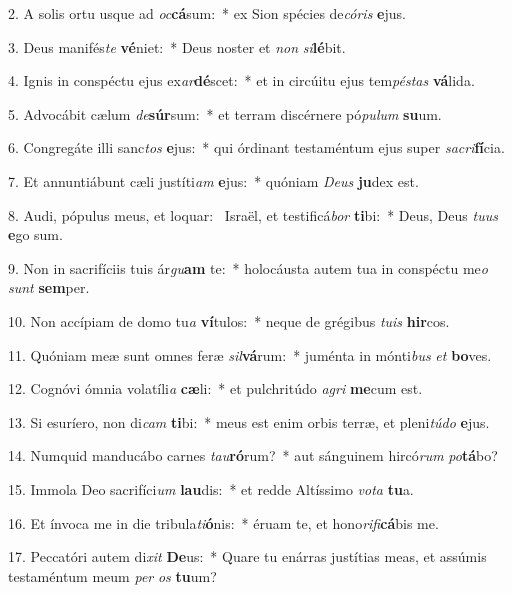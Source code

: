 2. A solis ortu usque ad \textit{oc}\textbf{cá}sum:~*  ex Sion spécies de\textit{có}\textit{ris} \textbf{e}jus.\

3. Deus manifés\textit{te} \textbf{vé}niet:~*  Deus noster et \textit{non} \textit{si}\textbf{lé}bit.\

4. Ignis in conspéctu ejus ex\textit{ar}\textbf{dé}scet:~*  et in circúitu ejus tem\textit{pés}\textit{tas} \textbf{vá}lida.\

5. Advocábit cælum \textit{de}\textbf{súr}sum:~*  et terram discérnere pó\textit{pu}\textit{lum} \textbf{su}um.\

6. Congregáte illi sanc\textit{tos} \textbf{e}jus:~*  qui órdinant testaméntum ejus super \textit{sa}\textit{cri}\textbf{fí}cia.\

7. Et annuntiábunt cæli justíti\textit{am} \textbf{e}jus:~*  quóniam \textit{De}\textit{us} \textbf{ju}dex est.\

8. Audi, pópulus meus, et loquar: \dag\  Israël, et testificá\textit{bor} \textbf{ti}bi:~*  Deus, Deus \textit{tu}\textit{us} \textbf{e}go sum.\

9. Non in sacrifíciis tuis ár\textit{gu}\textbf{am} te:~*  holocáusta autem tua in conspéctu me\textit{o} \textit{sunt} \textbf{sem}per.\

10. Non accípiam de domo tu\textit{a} \textbf{ví}tulos:~*  neque de grégibus \textit{tu}\textit{is} \textbf{hir}cos.\

11. Quóniam meæ sunt omnes feræ \textit{sil}\textbf{vá}rum:~*  juménta in mónti\textit{bus} \textit{et} \textbf{bo}ves.\

12. Cognóvi ómnia volatíli\textit{a} \textbf{cæ}li:~*  et pulchritúdo \textit{a}\textit{gri} \textbf{me}cum est.\

13. Si esuríero, non di\textit{cam} \textbf{ti}bi:~*  meus est enim orbis terræ, et pleni\textit{tú}\textit{do} \textbf{e}jus.\

14. Numquid manducábo carnes \textit{tau}\textbf{ró}rum?~*  aut sánguinem hircó\textit{rum} \textit{po}\textbf{tá}bo?\

15. Immola Deo sacrifíci\textit{um} \textbf{lau}dis:~*  et redde Altíssimo \textit{vo}\textit{ta} \textbf{tu}a.\

16. Et ínvoca me in die tribula\textit{ti}\textbf{ó}nis:~*  éruam te, et hono\textit{ri}\textit{fi}\textbf{cá}bis me.\

17. Peccatóri autem di\textit{xit} \textbf{De}us:~*  Quare tu enárras justítias meas, et assúmis testaméntum meum \textit{per} \textit{os} \textbf{tu}um?\

